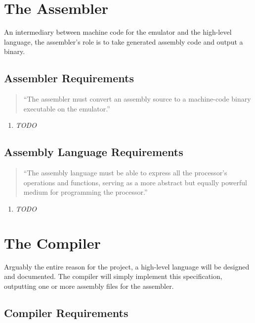 \documentclass{article}
\begin{document}
\section{The Assembler}

An intermediary between machine code for the emulator and the high-level language, the assembler's role is to take generated assembly code and output a binary.

\subsection{Assembler Requirements}

\begin{quote}
    ``The assembler must convert an assembly source to a machine-code binary executable on the emulator.''
\end{quote}

\begin{enumerate}[label=R\arabic*]
    \item \textit{TODO}
\end{enumerate}

\subsection{Assembly Language Requirements}

\begin{quote}
    ``The assembly language must be able to express all the processor's operations and functions, serving as a more abstract but equally powerful medium for programming the processor.''
\end{quote}

\begin{enumerate}[label=R\arabic*]
    \item \textit{TODO}
\end{enumerate}

\section{The Compiler}

Arguably the entire reason for the project, a high-level language will be designed and documented.
The compiler will simply implement this specification, outputting one or more assembly files for the assembler.

\subsection{Compiler Requirements}
\end{document}
